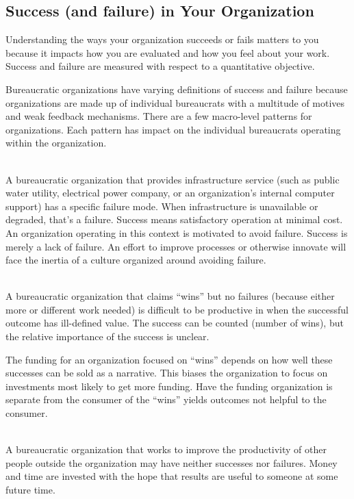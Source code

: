 \subsection{Success (and failure) in Your Organization}

Understanding the ways your organization succeeds or fails matters to you because it impacts how you are evaluated and how you feel about your work. Success and failure are measured with respect to a quantitative objective. 


Bureaucratic organizations have varying definitions of success and failure because organizations are made up of individual bureaucrats with a multitude of motives and weak feedback mechanisms. There are a few macro-level patterns for organizations. Each pattern has impact on the individual bureaucrats operating within the organization. 

\ \\

A bureaucratic organization that provides infrastructure service (such as public water utility, electrical power company, or an organization's internal computer support) has a specific failure mode. When infrastructure is unavailable or degraded, that's a failure. Success means satisfactory operation at minimal cost. An organization operating in this context is motivated to avoid failure. Success is merely a lack of failure. An effort to improve processes or otherwise innovate will face the inertia of a culture organized around avoiding failure. 

\ \\

A bureaucratic organization that claims ``wins'' but no failures (because either more or different work needed) is difficult to be productive in when the successful outcome has ill-defined value. The success can be counted (number of wins), but the relative importance of the success is unclear.

The funding for an organization focused on ``wins'' depends on how well these successes can be sold as a narrative. This biases the organization to focus on investments most likely to get more funding. Have the funding organization is separate from the consumer of the ``wins'' yields outcomes not helpful to the consumer.

\ \\

A bureaucratic organization that works to improve the productivity of other people outside the organization may have neither successes nor failures. Money and time are invested with the hope that results are useful to someone at some future time. 